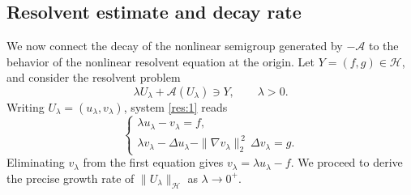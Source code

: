 \documentclass[11pt,reqno]{amsart}
\theoremstyle{remark}
\begin{document}
\subsection{Resolvent estimate and decay rate}

We now connect the decay of the nonlinear semigroup generated by $-\mathcal A$
to the behavior of the nonlinear resolvent equation at the origin. Let $Y=(f,g)\in\mathcal H$,
and consider the resolvent problem
\begin{equation}\label{res:1}
\lambda U_\lambda + \mathcal A(U_\lambda) \ni Y,
\qquad \lambda>0.
\end{equation}
Writing $U_\lambda=(u_\lambda,v_\lambda)$, system \eqref{res:1} reads
\begin{equation}\label{res:2}
\begin{cases}
\lambda u_\lambda - v_\lambda = f,\\
\lambda v_\lambda - \Delta u_\lambda - \|\nabla v_\lambda\|_{2}^{\,2}\,\Delta v_\lambda = g.
\end{cases}
\end{equation}
Eliminating $v_\lambda$ from the first equation gives $v_\lambda=\lambda u_\lambda - f$.
We proceed to derive the precise growth rate of $\|U_\lambda\|_{\mathcal{H}}$ as $\lambda \to 0^+$.
\end{document}

